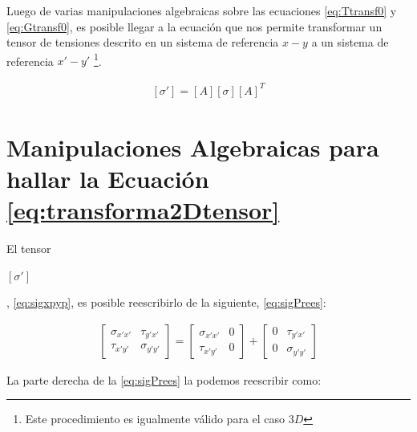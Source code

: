 \documentclass[12pt,letterpaper, twoside, openany]{article}
\begin{document}
%
Luego de varias manipulaciones algebraicas sobre las ecuaciones \ref{eq:Ttransf0} y \ref{eq:Gtransf0}, es posible llegar a la ecuación que nos permite transformar un tensor de tensiones descrito en un sistema de referencia $x-y$ a un sistema de referencia $x'-y'$ \footnote{Este procedimiento es igualmente válido para el caso $3D$}.
%
\begin{large}
	\begin{align}
		\left[ \sigma' \right] = \left[ A \right] \left[ \sigma \right] \left[ A \right]^T 
		\label{eq:transforma2Dtensor}
	\end{align}
\end{large}
%
\newpage
\section{Manipulaciones Algebraicas para hallar la Ecuación \ref{eq:transforma2Dtensor}}
%
El tensor \begin{large} $\left[ \sigma' \right]$\end{large}, \cref{eq:sigxpyp}, es posible reescribirlo de la siguiente, \cref{eq:sigPrees}:
%
\begin{large}
	\begin{align}
		\left[ \begin{array}{cc}
		\sigma_{x'x'} & \tau_{y'x'} \\  
		\tau_{x'y'} & \sigma_{y'y'}
		\end{array}  \right]=
		\left[ \begin{array}{cc}
		\sigma_{x'x'} & 0 \\  
		\tau_{x'y'} & 0
		\end{array}  \right] +
		\left[ \begin{array}{cc}
		0 & \tau_{y'x'} \\  
		0 & \sigma_{y'y'}
		\end{array}  \right]
		\label{eq:sigPrees}
	\end{align}
\end{large}
%
La parte derecha de la \cref{eq:sigPrees} la podemos reescribir como:
%
\end{document}
